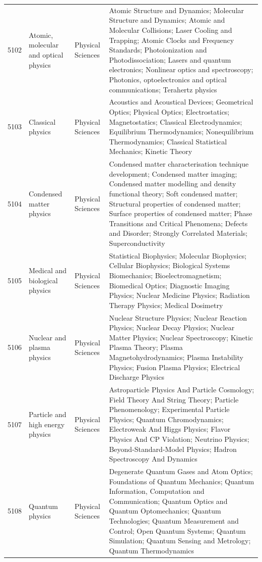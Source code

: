 \begin{longtable}{r p{2.45cm} p{2.55cm} p{6.15cm}}
5102 & Atomic, molecular and optical physics & Physical Sciences & Atomic Structure and Dynamics; Molecular Structure and Dynamics; Atomic and Molecular Collisions; Laser Cooling and Trapping; Atomic Clocks and Frequency Standards; Photoionization and Photodissociation; Lasers and quantum electronics; Nonlinear optics and spectroscopy; Photonics, optoelectronics and optical communications; Terahertz physics \\
5103 & Classical physics & Physical Sciences & Acoustics and Acoustical Devices; Geometrical Optics; Physical Optics; Electrostatics; Magnetostatics; Classical Electrodynamics; Equilibrium Thermodynamics; Nonequilibrium Thermodynamics; Classical Statistical Mechanics; Kinetic Theory \\
5104 & Condensed matter physics & Physical Sciences & Condensed matter characterisation technique development; Condensed matter imaging; Condensed matter modelling and density functional theory; Soft condensed matter; Structural properties of condensed matter; Surface properties of condensed matter; Phase Transitions and Critical Phenomena; Defects and Disorder; Strongly Correlated Materials; Superconductivity \\
5105 & Medical and biological physics & Physical Sciences & Statistical Biophysics; Molecular Biophysics; Cellular Biophysics; Biological Systems Biomechanics; Bioelectromagnetism; Biomedical Optics; Diagnostic Imaging Physics; Nuclear Medicine Physics; Radiation Therapy Physics; Medical Dosimetry \\
5106 & Nuclear and plasma physics & Physical Sciences & Nuclear Structure Physics; Nuclear Reaction Physics; Nuclear Decay Physics; Nuclear Matter Physics; Nuclear Spectroscopy; Kinetic Plasma Theory; Plasma Magnetohydrodynamics; Plasma Instability Physics; Fusion Plasma Physics; Electrical Discharge Physics \\
5107 & Particle and high energy physics & Physical Sciences & Astroparticle Physics And Particle Cosmology; Field Theory And String Theory; Particle Phenomenology; Experimental Particle Physics; Quantum Chromodynamics; Electroweak And Higgs Physics; Flavor Physics And CP Violation; Neutrino Physics; Beyond-Standard-Model Physics; Hadron Spectroscopy And Dynamics \\
5108 & Quantum physics & Physical Sciences & Degenerate Quantum Gases and Atom Optics; Foundations of Quantum Mechanics; Quantum Information, Computation and Communication; Quantum Optics and Quantum Optomechanics; Quantum Technologies; Quantum Measurement and Control; Open Quantum Systems; Quantum Simulation; Quantum Sensing and Metrology; Quantum Thermodynamics \\

\end{longtable}

